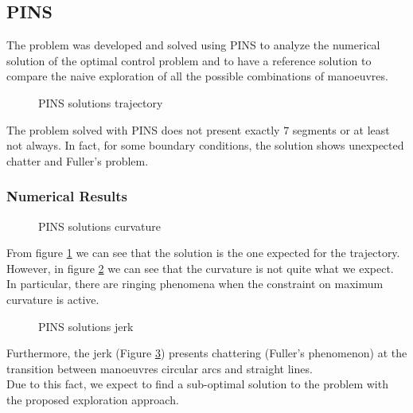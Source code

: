\documentclass[11pt,twocolumn]{scrartcl}
\begin{document}
\subsection*{PINS}
%
The problem was developed and solved using PINS to analyze the numerical solution of the optimal control problem and to have a reference solution to compare the naive exploration of all the possible combinations of manoeuvres.\\
%
\begin{figure}[htb!]
  \centering
  \caption{PINS solutions trajectory}
  \label{fig:PINS_sol_traj}
\end{figure}
%
The problem solved with PINS does not present exactly $7$ segments or at least not always. In fact, for some boundary conditions, the solution shows unexpected chatter and Fuller's problem. \cite{zhu2015planar}
%
\subsubsection*{Numerical Results}
%
\begin{figure}[htb!]
  \centering
  \caption{PINS solutions curvature}
  \label{fig:PINS_sol_curv}
\end{figure}
%
From figure \ref{fig:PINS_sol_traj} we can see that the solution is the one expected for the trajectory. However, in figure \ref{fig:PINS_sol_curv} we can see that the curvature is not quite what we expect. In particular, there are ringing phenomena when the constraint on maximum curvature is active. 
%
\begin{figure}[htb!]
  \centering
  \caption{PINS solutions jerk}
  \label{fig:PINS_sol_jerk}
\end{figure}
%
Furthermore, the jerk (Figure \ref{fig:PINS_sol_jerk}) presents chattering (Fuller's phenomenon) at the transition between manoeuvres circular arcs and straight lines.\\
Due to this fact, we expect to find a sub-optimal solution to the problem with the proposed exploration approach.
%
\end{document}
